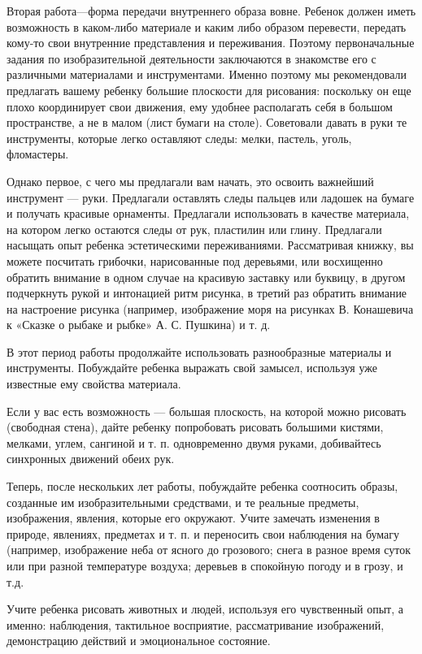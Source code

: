 \documentclass{book}
\begin{document}
Вторая работа---форма передачи внутреннего образа вовне. Ребенок должен
иметь возможность в каком-либо материале и каким либо образом перевести,
передать кому-то свои внутренние представления и переживания. Поэтому
первоначальные задания по изобразительной деятельности заключаются в
знакомстве его с различными материалами и инструментами. Именно поэтому
мы рекомендовали предлагать вашему ребенку большие плоскости для
рисования: поскольку он еще плохо координирует свои движения, ему
удобнее располагать себя в большом пространстве, а не в малом (лист
бумаги на столе). Советовали давать в руки те инструменты, которые легко
оставляют следы: мелки, пастель, уголь, фломастеры.

Однако первое, с чего мы предлагали вам начать, это освоить важнейший
инструмент --- руки. Предлагали оставлять следы пальцев или ладошек на
бумаге и получать красивые орнаменты. Предлагали использовать в качестве
материала, на котором легко остаются следы от рук, пластилин или глину.
Предлагали насыщать опыт ребенка эстетическими переживаниями.
Рассматривая книжку, вы можете посчитать грибочки, нарисованные под
деревьями, или восхищенно обратить внимание в одном случае на красивую
заставку или буквицу, в другом подчеркнуть рукой и интонацией ритм
рисунка, в третий раз обратить внимание на настроение рисунка (например,
изображение моря на рисунках В. Конашевича к «Сказке о рыбаке и рыбке»
А. С. Пушкина) и т. д.

В этот период работы продолжайте использовать разнообразные материалы и
инструменты. Побуждайте ребенка выражать свой замысел, используя уже
известные ему свойства материала.

Если у вас есть возможность --- большая плоскость, на которой можно
рисовать (свободная стена), дайте ребенку попробовать рисовать большими
кистями, мелками, углем, сангиной и т. п. одновременно двумя руками,
добивайтесь синхронных движений обеих рук.

Теперь, после нескольких лет работы, побуждайте ребенка соотносить
образы, созданные им изобразительными средствами, и те реальные
предметы, изображения, явления, которые его окружают. Учите замечать
изменения в природе, явлениях, предметах и т. п. и переносить свои
наблюдения на бумагу (например, изображение неба от ясного до грозового;
снега в разное время суток или при разной температуре воздуха; деревьев
в спокойную погоду и в грозу, и т.д.

Учите ребенка рисовать животных и людей, используя его чувственный опыт,
а именно: наблюдения, тактильное восприятие, рассматривание изображений,
демонстрацию действий и эмоциональное состояние.
\end{document}
